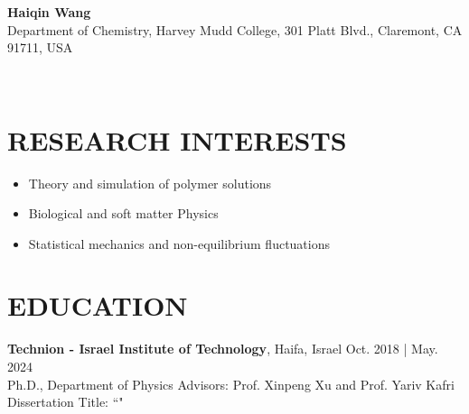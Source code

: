 \documentclass[a4paper,10pt]{extarticle}
\begin{document}
\pagestyle{fancy}
\renewcommand{\headrulewidth}{0pt}
\fancyhead{}
\thispagestyle{empty} %


\begin{flushleft}
\textbf{\Large Haiqin Wang} \\[2pt] %
Department of Chemistry, Harvey Mudd College,
301 Platt Blvd., Claremont, CA 91711, USA

\\
\end{flushleft}

\vspace{-0.4em}
\section*{RESEARCH INTERESTS}
\vspace{-0.9em}
\noindent
\begin{itemize}[leftmargin=*]
\item Theory and simulation of polymer solutions
\item Biological and soft matter Physics
\item Statistical mechanics and non-equilibrium fluctuations
\end{itemize}

\vspace{0.1em}
\section*{EDUCATION}
\noindent
\textbf{Technion - Israel Institute of Technology}, Haifa, Israel \hfill Oct. 2018 | May. 2024 \\ %
Ph.D., Department of Physics  \hfill Advisors: Prof. Xinpeng Xu and Prof. Yariv Kafri
\\Dissertation Title: ``" 
 
\end{document}
